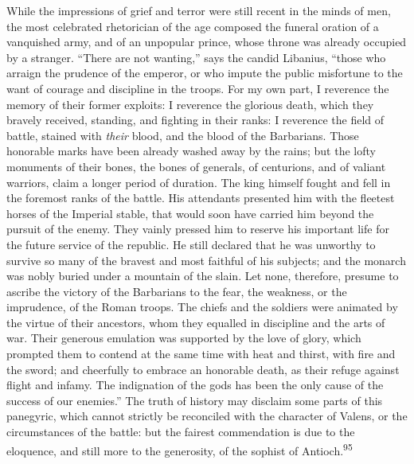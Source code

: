 
While the impressions of grief and terror were still recent in
the minds of men, the most celebrated rhetorician of the age
composed the funeral oration of a vanquished army, and of an
unpopular prince, whose throne was already occupied by a
stranger. “There are not wanting,” says the candid Libanius,
“those who arraign the prudence of the emperor, or who impute the
public misfortune to the want of courage and discipline in the
troops. For my own part, I reverence the memory of their former
exploits: I reverence the glorious death, which they bravely
received, standing, and fighting in their ranks: I reverence the
field of battle, stained with \textit{their} blood, and the blood of the
Barbarians. Those honorable marks have been already washed away
by the rains; but the lofty monuments of their bones, the bones
of generals, of centurions, and of valiant warriors, claim a
longer period of duration. The king himself fought and fell in
the foremost ranks of the battle. His attendants presented him
with the fleetest horses of the Imperial stable, that would soon
have carried him beyond the pursuit of the enemy. They vainly
pressed him to reserve his important life for the future service
of the republic. He still declared that he was unworthy to
survive so many of the bravest and most faithful of his subjects;
and the monarch was nobly buried under a mountain of the slain.
Let none, therefore, presume to ascribe the victory of the
Barbarians to the fear, the weakness, or the imprudence, of the
Roman troops. The chiefs and the soldiers were animated by the
virtue of their ancestors, whom they equalled in discipline and
the arts of war. Their generous emulation was supported by the
love of glory, which prompted them to contend at the same time
with heat and thirst, with fire and the sword; and cheerfully to
embrace an honorable death, as their refuge against flight and
infamy. The indignation of the gods has been the only cause of
the success of our enemies.” The truth of history may disclaim
some parts of this panegyric, which cannot strictly be reconciled
with the character of Valens, or the circumstances of the battle:
but the fairest commendation is due to the eloquence, and still
more to the generosity, of the sophist of Antioch.\textsuperscript{95}

